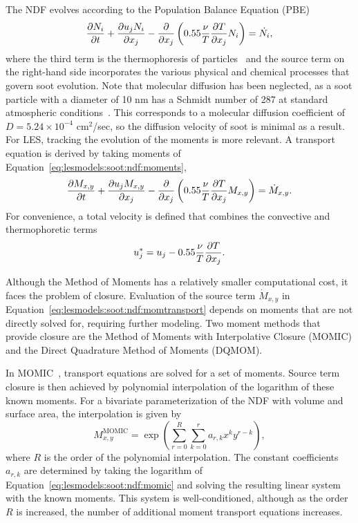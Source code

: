 The NDF evolves according to the Population Balance Equation (PBE)~\cite{friedlander2000}
\begin{equation}\label{eq:lesmodels:soot:ndf:pbe}
  \tder{N_i} - \pder[]{x_j}\left( 0.55\frac{\nu}{T}\pder[T]{x_j}N_i \right) = \dot{N_i},
\end{equation}
where the third term is the thermophoresis of particles~\cite{waldmann1966} and the source term on the right-hand side incorporates the various physical and chemical processes that govern soot evolution. Note that molecular diffusion has been neglected, as a soot particle with a diameter of 10 nm has a Schmidt number of 287 at standard atmospheric conditions~\cite{friedlander2000}. This corresponds to a molecular diffusion coefficient of $D = 5.24\times 10^{-4}$ cm$^2$/sec, so the diffusion velocity of soot is minimal as a result. For LES, tracking the evolution of the moments is more relevant. A transport equation is derived by taking moments of Equation~\ref{eq:lesmodels:soot:ndf:moments},
\begin{equation}\label{eq:lesmodels:soot:ndf:momtransport}
  \tder{M_{x,y}} - \pder[]{x_j}\left( 0.55\frac{\nu}{T}\pder[T]{x_j}M_{x,y} \right) = \dot{M}_{x,y}.
\end{equation}
For convenience, a total velocity is defined that combines the convective and thermophoretic terms
\begin{equation}\label{eq:lesmodels:soot:ndf:totvel}
  u_j^* = u_j - 0.55\frac{\nu}{T}\pder[T]{x_j}.
\end{equation}

Although the Method of Moments has a relatively smaller computational cost, it faces the problem of closure. Evaluation of the source term $\dot{M}_{x,y}$ in Equation~\ref{eq:lesmodels:soot:ndf:momtransport} depends on moments that are not directly solved for, requiring further modeling. Two moment methods that provide closure are the Method of Moments with Interpolative Closure (MOMIC) and the Direct Quadrature Method of Moments (DQMOM).

In MOMIC~\cite{frenklach2002,frenklach1987,frenklach1994}, transport equations are solved for a set of moments. Source term closure is then achieved by polynomial interpolation of the logarithm of these known moments. For a bivariate parameterization of the NDF with volume and surface area, the interpolation is given by
\begin{equation}\label{eq:lesmodels:soot:ndf:momic}
  M_{x,y}^{\text{MOMIC}} = \exp\left( \sum\limits_{r=0}^{R} \sum\limits_{k=0}^{r} a_{r,k}x^k y^{r-k} \right),
\end{equation}
where $R$ is the order of the polynomial interpolation. The constant coefficients $a_{r,k}$ are determined by taking the logarithm of Equation~\ref{eq:lesmodels:soot:ndf:momic} and solving the resulting linear system with the known moments. This system is well-conditioned, although as the order $R$ is increased, the number of additional moment transport equations increases.


